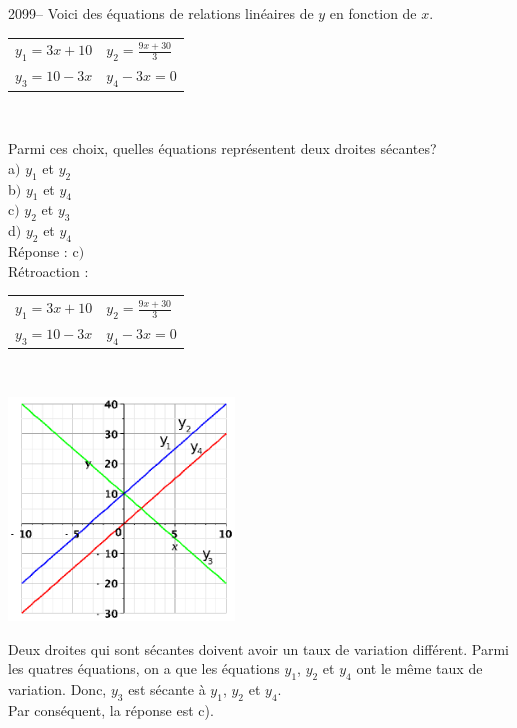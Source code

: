 \documentclass[letterpaper, 12pt]{article}
\begin{document}
2099-- Voici des \'equations de relations lin\'eaires de $y$ en fonction de $x$.
\begin{center}
\begin{tabular}{l l}
 $ y_{1}=3x+10 $ &  $ y_{2}=\frac{9x+30}{3} $ \\
 $ y_{3}=10-3x $ &  $ y_{4}-3x=0 $ \\
\end{tabular}\\
\end{center}
Parmi ces choix, quelles \'equations repr\'esentent deux droites s\'ecantes?\\

a$)$ $ y_{1}$ et $ y_{2}$\\
b$)$ $ y_{1}$ et $ y_{4}$\\
c$)$ $ y_{2}$ et $ y_{3}$\\
d$)$ $ y_{2}$ et $ y_{4}$\\

R\'eponse : c$)$\\

R\'etroaction :
\begin{center}
\begin{tabular}{l l}
 $ y_{1}=3x+10 $ &  $ y_{2}=\frac{9x+30}{3} $ \\
 $ y_{3}=10-3x $ &  $ y_{4}-3x=0 $ \\
\end{tabular}\\
\end{center}
\begin{center}
 \includegraphics[width=6cm,bb=14 14 215 215]{Q2098.eps}
\end{center}
Deux droites qui sont s\'ecantes doivent avoir un taux de variation diff\'erent. Parmi les quatres \'equations, on a que les \'equations $ y_{1}$, $ y_{2}$ et $ y_{4}$ ont le m\^eme taux de variation. Donc, $ y_{3}$ est s\'ecante \`a $ y_{1}$, $ y_{2}$ et $ y_{4}$.\\
Par cons\'equent, la r\'eponse est c).\\
\end{document}
